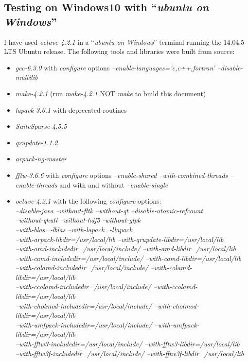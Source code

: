 \documentclass[a4paper,twoside,10pt,english]{report}
\begin{document}
\subsection*{Testing on Windows10 with ``\emph{ubuntu on Windows}''}
I have used \emph{octave-4.2.1} in a ``\emph{ubuntu on Windows}'' terminal
running the 14.04.5 LTS Ubuntu release. The following tools and libraries were
built from source:

\begin{itemize}
\item \emph{gcc-6.3.0} with \emph{configure} options
\emph{--enable-languages='c,c++,fortran' --disable-multilib}
\item \emph{make-4.2.1} (run \emph{make-4.2.1} NOT \emph{make} to build this
    document)
\item \emph{lapack-3.6.1} with deprecated routines
\item \emph{SuiteSparse-4.5.5}
\item \emph{qrupdate-1.1.2}
\item \emph{arpack-ng-master}
\item \emph{fftw-3.6.6} with \emph{configure} options \emph{--enable-shared
    --with-combined-threads --enable-threads} and with and without
  \emph{--enable-single}
\item \emph{octave-4.2.1} with the following \emph{configure} options: \\
\emph{  --disable-java --without-fltk --without-qt --disable-atomic-refcount \\
    --without-qhull --without-hdf5 -without-glpk \\
    --with-blas=-lblas --with-lapack=-llapack \\
    --with-arpack-libdir=/usr/local/lib
    --with-qrupdate-libdir=/usr/local/lib \\
    --with-amd-includedir=/usr/local/include/
    --with-amd-libdir=/usr/local/lib \\
    --with-camd-includedir=/usr/local/include/
    --with-camd-libdir=/usr/local/lib \\ 
    --with-colamd-includedir=/usr/local/include/
    --with-colamd-libdir=/usr/local/lib \\
    --with-ccolamd-includedir=/usr/local/include/ 
    --with-ccolamd-libdir=/usr/local/lib \\
    --with-cholmod-includedir=/usr/local/include/
    --with-cholmod-libdir=/usr/local/lib \\
    --with-umfpack-includedir=/usr/local/include/
    --with-umfpack-libdir=/usr/local/lib \\
    --with-fftw3-includedir=/usr/local/include/
    --with-fftw3-libdir=/usr/local/lib \\
    --with-fftw3f-includedir=/usr/local/include/
    --with-fftw3f-libdir=/usr/local/lib}
\end{itemize}
\end{document}

